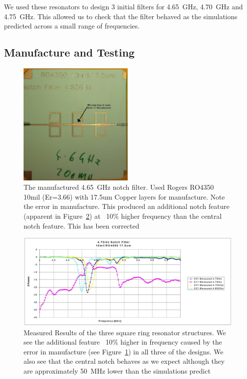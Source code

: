 We used these resonators to design 3 initial filters for 4.65~GHz, 4.70~GHz and 4.75~GHz. This allowed us to check that the filter behaved as the simulations predicted across a small range of frequencies.
\clearpage
\subsection{Manufacture and Testing}

\begin{figure}
 \centering
 \includegraphics[width=0.5\textwidth]{./images/NotchFilter/IMAG0148a.jpg}
 \caption{The manufactured 4.65~GHz notch filter. Used Rogers RO4350 10mil (Er=3.66) with 17.5um Copper layers for manufacture. Note the error in manufacture. This produced an additional notch feature (apparent in Figure~\ref{fig:MeasuredResults}) at ~10\% higher frequency than the central notch feature. This has been corrected}
 \label{fig:4_65GHzFilter}
\end{figure}


\begin{figure}
 \centering
 \includegraphics[width=\textwidth]{./images/NotchFilter/MeauredResults.JPG}
 \caption{Measured Results of the three square ring resonator structures. We see the additional feature ~10\% higher in frequency caused by the error in manufacture (see Figure~\ref{fig:4_65GHzFilter}) in all three of the designs. We also see that the central notch behaves as we expect although they are approximately 50~MHz lower than the simulations predict}
 \label{fig:MeasuredResults}
\end{figure}

